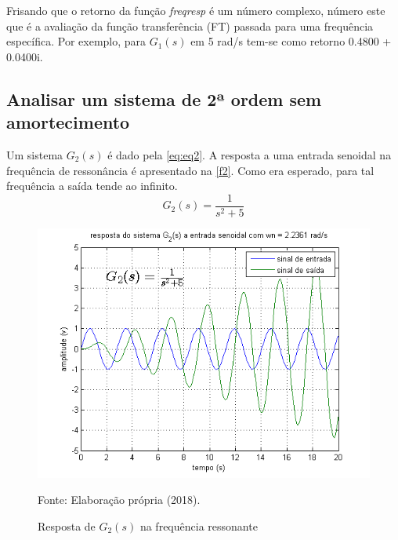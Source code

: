 Frisando que o retorno da função \textit{freqresp} é um número complexo, número este que é a avaliação da função transferência (FT) passada para uma frequência específica. Por exemplo, para $G_1(s)$ em 5 rad/s tem-se como retorno 0.4800 + 0.0400i.

\subsection{Analisar um sistema de 2ª ordem sem amortecimento}

Um sistema $G_2(s)$ é dado pela \autoref{eq:eq2}. A resposta a uma entrada senoidal na frequência de ressonância é apresentado na \autoref{f2}. Como era esperado, para tal frequência a saída tende ao infinito.
\\
\begin{equation}
    G_2(s) = \frac{1}{s^{2} + 5}
    \label{eq:eq2}
\end{equation}

\begin{figure}[h!]
    \centering
    \caption{Resposta de $G_2(s)$ na frequência ressonante}
    \includegraphics[scale=0.55]{img/task_7_02.png}
    \label{f2}
    \begin{flushleft}
        Fonte: Elaboração própria (2018).
    \end{flushleft}
\end{figure}


